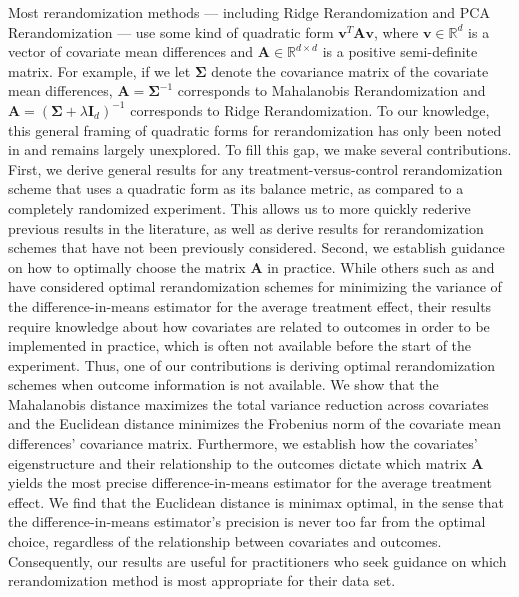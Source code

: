 \documentclass[11pt,twoside]{article}
\theoremstyle{definition}
\theoremstyle{remark}
\begin{document}
Most rerandomization methods --- including Ridge Rerandomization and PCA Rerandomization --- use some kind of quadratic form $\mathbf{v}^T \mathbf{A} \mathbf{v}$, where $\mathbf{v} \in \mathbb{R}^d$ is a vector of covariate mean differences and $\mathbf{A}\in \mathbb{R}^{d \times d}$ is a positive semi-definite matrix. For example, if we let $\mathbf{\Sigma}$ denote the covariance matrix of the covariate mean differences, $\mathbf{A} = \mathbf{\Sigma}^{-1}$ corresponds to Mahalanobis Rerandomization and $\mathbf{A} = (\mathbf{\Sigma} + \lambda \mathbf{I}_d)^{-1}$ corresponds to Ridge Rerandomization. To our knowledge, this general framing of quadratic forms for rerandomization has only been noted in \cite{lu2023design} and remains largely unexplored. To fill this gap, we make several contributions. First, we derive general results for any treatment-versus-control rerandomization scheme that uses a quadratic form as its balance metric, as compared to a completely randomized experiment. This allows us to more quickly rederive previous results in the literature, as well as derive results for rerandomization schemes that have not been previously considered. Second, we establish guidance on how to optimally choose the matrix $\mathbf{A}$ in practice. While others such as \cite{liu2023bayesian} and \cite{lu2023design} have considered optimal rerandomization schemes for minimizing the variance of the difference-in-means estimator for the average treatment effect, their results require knowledge about how covariates are related to outcomes in order to be implemented in practice, which is often not available before the start of the experiment. Thus, one of our contributions is deriving optimal rerandomization schemes when outcome information is not available. We show that the Mahalanobis distance maximizes the total variance reduction across covariates and the Euclidean distance minimizes the Frobenius norm of the covariate mean differences' covariance matrix. Furthermore, we establish how the covariates' eigenstructure and their relationship to the outcomes dictate which matrix $\mathbf{A}$ yields the most precise difference-in-means estimator for the average treatment effect. We find that the Euclidean distance is minimax optimal, in the sense that the difference-in-means estimator's precision is never too far from the optimal choice, regardless of the relationship between covariates and outcomes. Consequently, our results are useful for practitioners who seek guidance on which rerandomization method is most appropriate for their data set.
\end{document}
